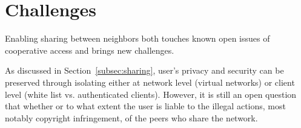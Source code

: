 \section{Challenges}
\label{sec:challenges}

Enabling \wifi{} sharing between neighbors both touches known open issues of
cooperative \wifi{} access and brings new challenges.

As discussed in Section~\ref{subsec:sharing}, user's privacy and security can be
preserved through isolating either at network level (virtual networks) or client
level (white list vs. authenticated clients). However, it is still an open
question that whether or to what extent the user is liable to the illegal
actions, most notably copyright infringement, of the peers who share the
network.
